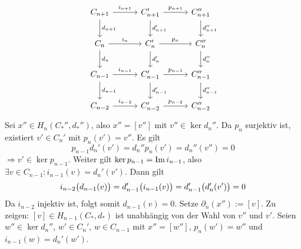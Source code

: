 \[
	\begin{tikzcd}[row sep=2em, column sep=3em]
		C_{n+1} \rar["i_{n+1}"] \dar["d_{n+1}"] & C_{n+1}' \rar["p_{n+1}"] \dar["d_{n+1}'"] & C_{n+1}'' \dar["d_{n+1}''"] \\
		C_n \rar["i_n"] \dar["d_{n}"]& C_n' \rar["p_n"] \dar["d_{n}'"]& C_n'' \dar["d_{n}''"]\\
		C_{n-1} \rar["i_{n-1}"] \dar["d_{n-1}"]& C_{n-1}'  \rar["p_{n-1}"] \dar["d_{n-1}'"]& C_{n-1}'' \dar["d_{n-1}''"]\\
		C_{n-2} \rar["i_{n-2}"]& C_{n-2}' \rar["p_{n-2}"] & C_{n-2}''
	\end{tikzcd}
\]
Sei $x'' \in H_n(C_*'',d_*'')$, also $x'' = [v'']$ mit $v'' \in \ker d_n''$. Da $p_n$ surjektiv ist, existiert $v' \in C_n'$ mit $p_n(v')=v''$. Es gilt
\[
	p_{n-1} d_n'(v') = d_n'' p_n(v') = d_n''(v'') = 0
\]
$\Rightarrow v' \in \ker p_{n-1}$. Weiter gilt $\ker p_{n-1}= \im i_{n-1}$, also $\exists v \in C_{n-1} : i_{n-1}(v)= d_n'(v')$. Dann gilt
\[
	i_{n-2} \enbrace[\big]{d_{n-1}(v)} = d'_{n-1} \enbrace[\big]{i_{n-1}(v)} = d_{n-1}' \enbrace[\big]{d_n'(v')} = 0   
\]
Da $i_{n-2}$ injektiv ist, folgt somit $d_{n-1}(v)=0$. Setze $\partial_n(x'') := [v]$. Zu zeigen: $[v] \in H_{n-1}(C_*,d_*)$ ist unabhängig von der Wahl von $v''$ und $v'$.
Seien $w'' \in \ker d_n''$, $w' \in C_n'$, $w \in C_{n-1}$ mit $x''=[w'']$, $p_n(w')=w''$ und $i_{n-1}(w)= d_n'(w')$. 


